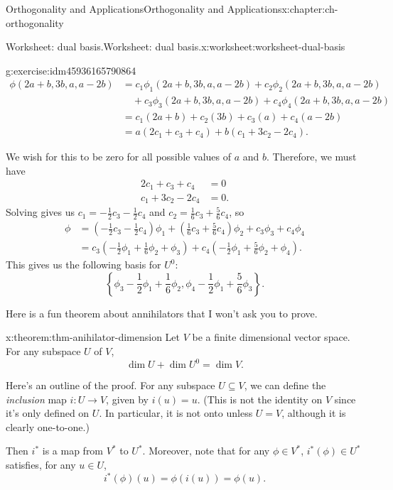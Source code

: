 \documentclass[oneside,10pt,]{book}
\numberwithin{equation}{section}
\newcommand{\amp}{&}
\begin{document}
\begin{chapterptx}{Orthogonality and Applications}{}{Orthogonality and Applications}{}{}{x:chapter:ch-orthogonality}
\begin{worksheet-section}{Worksheet: dual basis.}{}{Worksheet: dual basis.}{}{}{x:worksheet:worksheet-dual-basis}
\begin{divisionexercise}{5}{}{}{g:exercise:idm45936165790864}
\begin{align*}
\phi(2a+b,3b,a,a-2b) \amp  = c_1\phi_1(2a+b,3b,a,a-2b)+c_2\phi_2(2a+b,3b,a,a-2b)\\
\amp \quad + c_3\phi_3(2a+b,3b,a,a-2b)+c_4\phi_4(2a+b,3b,a,a-2b)\\
\amp  = c_1(2a+b)+c_2(3b)+c_3(a)+c_4(a-2b)\\
\amp  = a(2c_1+c_3+c_4)+b(c_1+3c_2-2c_4)\text{.}
\end{align*}
%
\par
We wish for this to be zero for all possible values of \(a\) and \(b\). Therefore, we must have%
\begin{align*}
2c_1+c_3+c_4\amp =0\\
c_1+3c_2-2c_4\amp =0\text{.}
\end{align*}
Solving gives us \(c_1=-\frac12 c_3-\frac12 c_4\) and \(c_2=\frac16 c_3+\frac56 c_4\), so%
\begin{align*}
\phi \amp = \left(-\frac12 c_3-\frac12 c_4\right)\phi_1 +\left(\frac16 c_3+\frac56 c_4\right)\phi_2 + c_3\phi_3 + c_4\phi_4\\
\amp  = c_3\left(-\frac12 \phi_1 + \frac16 \phi_2+\phi_3\right)+c_4\left(-\frac12\phi_1+\frac56 \phi_2 + \phi_4\right)\text{.}
\end{align*}
This gives us the following basis for \(U^0\):%
\begin{equation*}
\left\{\phi_3-\frac12 \phi_1+\frac16 \phi_2, \phi_4-\frac12\phi_1+\frac56\phi_3\right\}\text{.}
\end{equation*}
%
\end{divisionexercise}%
Here is a fun theorem about annihilators that I won't ask you to prove.%
\begin{theorem}{}{}{x:theorem:thm-anihilator-dimension}%
Let \(V\) be a finite dimensional vector space. For any subspace \(U\) of \(V\),%
\begin{equation*}
\dim U + \dim U^0 = \dim V\text{.}
\end{equation*}
%
\end{theorem}
Here's an outline of the proof. For any subspace \(U\subseteq V\), we can define the \emph{inclusion} map \(i:U\to V\), given by \(i(u)=u\). (This is not the identity on \(V\) since it's only defined on \(U\). In particular, it is not onto unless \(U=V\), although it is clearly one-to-one.)%
\par
Then \(i^*\) is a map from \(V^*\) to \(U^*\). Moreover, note that for any \(\phi\in V^*\), \(i^*(\phi)\in U^*\) satisfies, for any \(u\in U\),%
\begin{equation*}
i^*(\phi)(u) = \phi(i(u))=\phi(u)\text{.}

\end{equation*}
\end{worksheet-section}
\end{chapterptx}
\end{document}
